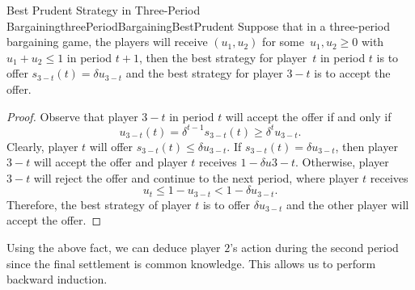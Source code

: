 \documentclass[math]{amznotes}
\theoremstyle{remark}
\begin{document}
\begin{probox}{Best Prudent Strategy in Three-Period Bargaining}{threePeriodBargainingBestPrudent}
    Suppose that in a three-period bargaining game, the players will receive $\left(u_1, u_2\right)$ for some~$u_1, u_2 \geq 0$ with $u_1 + u_2 \leq 1$ in period $t + 1$, then the best strategy for player~$t$ in period $t$ is to offer $s_{3 - t}\left(t\right) = \delta u_{3 - t}$ and the best strategy for player $3 - t$ is to accept the offer.
    \tcblower
    \begin{proof}
        Observe that player $3 - t$ in period $t$ will accept the offer if and only if 
        \begin{equation*}
            u_{3 - t}\left(t\right) = \delta^{t - 1}s_{3 - t}\left(t\right) \geq \delta^tu_{3 - t}.
        \end{equation*} 
        Clearly, player $t$ will offer $s_{3 - t}\left(t\right) \leq \delta u_{3 - t}$. If $s_{3 - t}\left(t\right) = \delta u_{3 - t}$, then player $3 - t$ will accept the offer and player $t$ receives $1 - \delta u{3 - t}$. Otherwise, player $3 - t$ will reject the offer and continue to the next period, where player $t$ receives
        \begin{equation*}
            u_t \leq 1 - u_{3 - t} < 1 - \delta u_{3 - t}.
        \end{equation*}
        Therefore, the best strategy of player $t$ is to offer $\delta u_{3 - t}$ and the other player will accept the offer.
    \end{proof}
\end{probox}
Using the above fact, we can deduce player $2$'s action during the second period since the final settlement is common knowledge. This allows us to perform backward induction.
\end{document}
